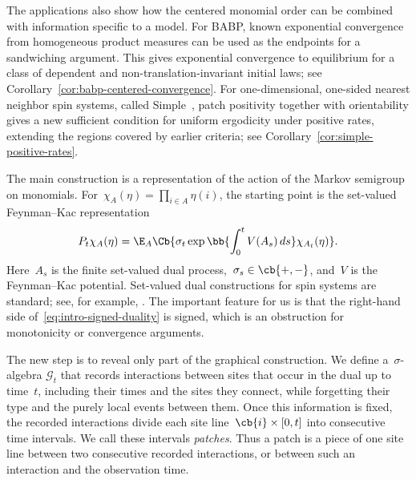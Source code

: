 The applications also show how the centered monomial order can be combined
with information specific to a model. For BABP, known exponential convergence
from homogeneous product measures can be used as the endpoints for a sandwiching argument. This gives exponential convergence to equilibrium for a
class of dependent and non-translation-invariant initial laws; see
Corollary~\ref{cor:babp-centered-convergence}. For one-dimensional, one-sided nearest neighbor spin systems, called Simple~\cite{GluchowskiMenz2025,GluchowskiMenz2026}, patch positivity together with orientability gives a new sufficient
condition for uniform ergodicity under positive rates, extending the regions
covered by earlier criteria; see
Corollary~\ref{cor:simple-positive-rates}.

The main construction is a representation of the action of the Markov semigroup on monomials. For~$\chi_A(\eta)=\prod_{i\in A}\eta(i)$, the starting point is
the set-valued Feynman--Kac representation
\begin{equation}
\label{eq:intro-signed-duality}
P_t\chi_A(\eta)
=
\E_A\Cb{
\sigma_t
\exp\bb{\int_0^t V(A_s)\,ds}
\chi_{A_t}(\eta)
}.
\end{equation}
Here~$A_s$ is the finite set-valued dual process,~$\sigma_s\in\cb{+,-}$, and~$V$
is the Feynman--Kac potential. Set-valued dual constructions for spin systems
are standard; see, for example,
\cite{Harris1978,Griffeath1979,Gray1986,JansenKurt2014}. The important feature
for us is that the right-hand side of~\eqref{eq:intro-signed-duality} is
signed, which is an obstruction for monotonicity or convergence arguments.

The new step is to reveal only part of the graphical construction. We define a~$\sigma$-algebra
$\mathcal G_t$ that records interactions between sites that occur in the
dual up to time~$t$, including their times and the sites they connect, while
forgetting their type and the purely local events between them. Once this
information is fixed, the recorded interactions divide each site line~$\cb{i}\times[0,t]$ into
consecutive time intervals. We call these intervals \emph{patches}. Thus a
patch is a piece of one site line between two consecutive recorded
interactions, or between such an interaction and the observation time.

